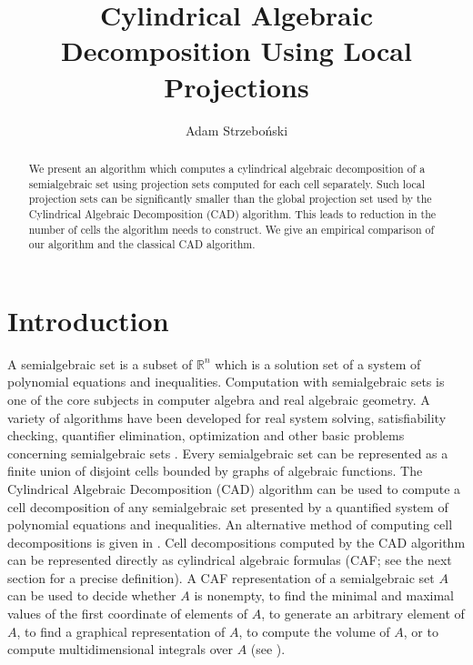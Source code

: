 \documentclass[english]{amsart}
\numberwithin{equation}{section}
\numberwithin{figure}{section}
\begin{document}
\title{Cylindrical Algebraic Decomposition Using Local Projections}

\author{Adam Strzebo\'nski}

\address{Wolfram Research Inc., 100 Trade Centre Drive, Champaign, IL 61820,
U.S.A. }



\maketitle

\begin{abstract}
We present an algorithm which computes a cylindrical algebraic decomposition
of a semialgebraic set using projection sets computed for each cell
separately. Such local projection sets can be significantly smaller
than the global projection set used by the Cylindrical Algebraic Decomposition
(CAD) algorithm. This leads to reduction in the number of cells the
algorithm needs to construct. We give an empirical comparison of our
algorithm and the classical CAD algorithm.
\end{abstract}

\section{Introduction}

A semialgebraic set is a subset of $\mathbb{R}^{n}$ which is a solution
set of a system of polynomial equations and inequalities. Computation
with semialgebraic sets is one of the core subjects in computer algebra
and real algebraic geometry. A variety of algorithms have been developed
for real system solving, satisfiability checking, quantifier elimination,
optimization and other basic problems concerning semialgebraic sets
\cite{C,BPR,CJ,CMXY,DSW,GV,HS,LW,R,T,W1}. Every semialgebraic set
can be represented as a finite union of disjoint cells bounded by
graphs of algebraic functions. The Cylindrical Algebraic Decomposition
(CAD) algorithm \cite{C,CJ,S7} can be used to compute a cell decomposition
of any semialgebraic set presented by a quantified system of polynomial
equations and inequalities. An alternative method of computing cell
decompositions is given in \cite{CMXY}. Cell decompositions computed
by the CAD algorithm can be represented directly \cite{S7,S8,B2}
as cylindrical algebraic formulas (CAF; see the next section for a
precise definition). A CAF representation of a semialgebraic set $A$
can be used to decide whether $A$ is nonempty, to find the minimal
and maximal values of the first coordinate of elements of $A$, to
generate an arbitrary element of $A$, to find a graphical representation
of $A$, to compute the volume of $A$, or to compute multidimensional
integrals over $A$ (see \cite{S4}). 
\end{document}
